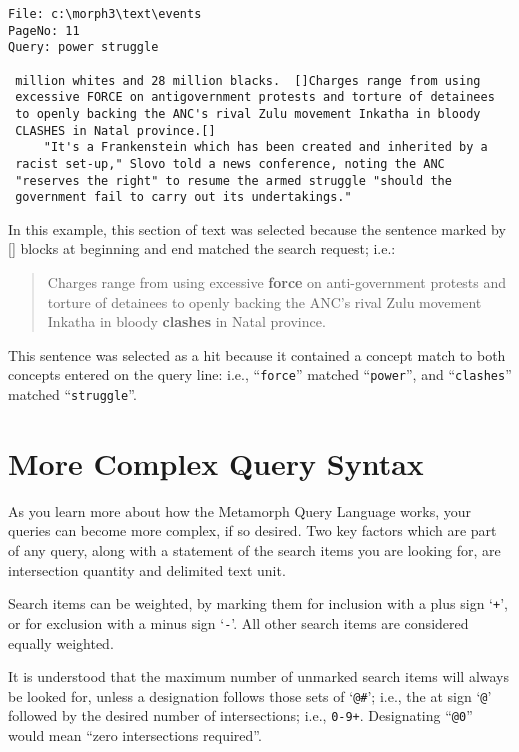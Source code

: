 \begin{screen}
\begin{verbatim}
File: c:\morph3\text\events
PageNo: 11
Query: power struggle

 million whites and 28 million blacks.  []Charges range from using
 excessive FORCE on antigovernment protests and torture of detainees
 to openly backing the ANC's rival Zulu movement Inkatha in bloody
 CLASHES in Natal province.[]
     "It's a Frankenstein which has been created and inherited by a
 racist set-up," Slovo told a news conference, noting the ANC
 "reserves the right" to resume the armed struggle "should the
 government fail to carry out its undertakings."
\end{verbatim}
\end{screen}

In this example, this section of text was selected because the
sentence marked by [] blocks at beginning and end matched
the search request; i.e.:

\begin{quote}
Charges range from using excessive {\bf force} on anti-government protests
and torture of detainees to openly backing the ANC's rival Zulu movement
Inkatha in bloody {\bf clashes} in Natal province.
\end{quote}

This sentence was selected as a hit because it contained a concept
match to both concepts entered on the query line:  i.e.,
``\verb`force`'' matched ``\verb`power`'', and ``\verb`clashes`''
matched ``\verb`struggle`''.

\section{More Complex Query Syntax}

As you learn more about how the Metamorph Query Language works, your
queries can become more complex, if so desired.  Two key factors which
are part of any query, along with a statement of the search items you
are looking for, are intersection quantity and delimited text unit.

Search items can be weighted, by marking them for inclusion with a
plus sign `\verb`+`', or for exclusion with a minus sign `\verb`-`'.
All other search items are considered equally weighted.

It is understood that the maximum number of unmarked search items will
always be looked for, unless a designation follows those sets of
`\verb`@#`'; i.e., the at sign `\verb`@`' followed by the desired
number of intersections; i.e., \verb`0-9+`.  Designating ``\verb`@0`''
would mean ``zero intersections required''.


